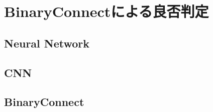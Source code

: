 

\chapter{BinaryConnectによる良否判定}

\section{Neural Network}

\section{CNN}

\section{BinaryConnect}

